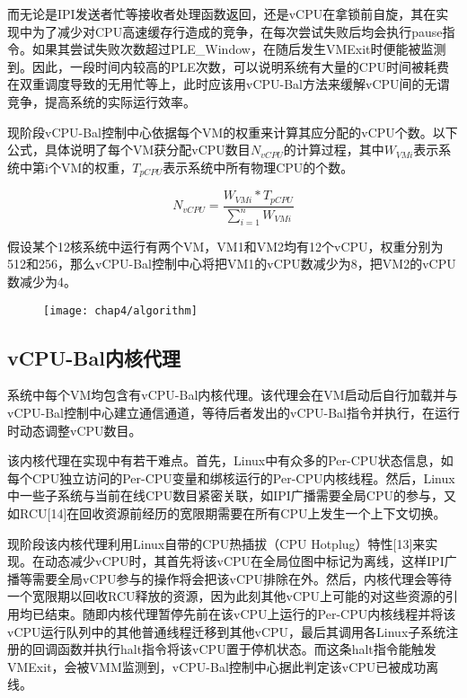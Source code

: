 而无论是IPI发送者忙等接收者处理函数返回，还是vCPU在拿锁前自旋，其在实现中为了减少对CPU高速缓存行造成的竞争，在每次尝试失败后均会执行pause指令。如果其尝试失败次数超过PLE\_Window，在随后发生VMExit时便能被监测到。因此，一段时间内较高的PLE次数，可以说明系统有大量的CPU时间被耗费在双重调度导致的无用忙等上，此时应该用vCPU-Bal方法来缓解vCPU间的无谓竞争，提高系统的实际运行效率。

现阶段vCPU-Bal控制中心依据每个VM的权重来计算其应分配的vCPU个数。以下公式，具体说明了每个VM获分配vCPU数目$N_{vCPU}$的计算过程，其中$W_{VMi}$表示系统中第i个VM的权重，$T_{pCPU}$表示系统中所有物理CPU的个数。

\begin{equation*}
N_{vCPU} = \frac{W_{VMi} * T_{pCPU}}{\sum_{i=1}^n W_{VMi}}
\end{equation*}

假设某个12核系统中运行有两个VM，VM1和VM2均有12个vCPU，权重分别为512和256，那么vCPU-Bal控制中心将把VM1的vCPU数减少为8，把VM2的vCPU数减少为4。

\begin{figure}[!htp]
  \centering
  \texttt{[image: chap4/algorithm]}
\end{figure}

\subsection{vCPU-Bal内核代理}

系统中每个VM均包含有vCPU-Bal内核代理。该代理会在VM启动后自行加载并与vCPU-Bal控制中心建立通信通道，等待后者发出的vCPU-Bal指令并执行，在运行时动态调整vCPU数目。

该内核代理在实现中有若干难点。首先，Linux中有众多的Per-CPU状态信息，如每个CPU独立访问的Per-CPU变量和绑核运行的Per-CPU内核线程。然后，Linux中一些子系统与当前在线CPU数目紧密关联，如IPI广播需要全局CPU的参与，又如RCU[14]在回收资源前经历的宽限期需要在所有CPU上发生一个上下文切换。

现阶段该内核代理利用Linux自带的CPU热插拔（CPU Hotplug）特性[13]来实现。在动态减少vCPU时，其首先将该vCPU在全局位图中标记为离线，这样IPI广播等需要全局vCPU参与的操作将会把该vCPU排除在外。然后，内核代理会等待一个宽限期以回收RCU释放的资源，因为此刻其他vCPU上可能的对这些资源的引用均已结束。随即内核代理暂停先前在该vCPU上运行的Per-CPU内核线程并将该vCPU运行队列中的其他普通线程迁移到其他vCPU，最后其调用各Linux子系统注册的回调函数并执行halt指令将该vCPU置于停机状态。而这条halt指令能触发VMExit，会被VMM监测到，vCPU-Bal控制中心据此判定该vCPU已被成功离线。

